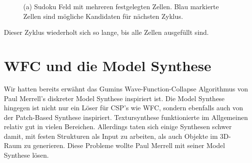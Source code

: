 \documentclass[12pt, a4paper,twoside,openright]{report}
\begin{document}
\begin{figure}[H]
    \centering
    \caption{(a) Sudoku Feld mit mehreren festgelegten Zellen. Blau markierte Zellen sind mögliche Kandidaten für nächsten Zyklus.}%
\end{figure}

Dieser Zyklus wiederholt sich so lange, bis alle Zellen ausgefüllt sind.

\section{WFC und die Model Synthese}

Wir hatten bereits erwähnt das Gumins Wave-Function-Collapse Algorithmus von Paul Merrell's diskreter Model Synthese inspiriert ist.
Die Model Synthese hingegen ist nicht nur ein Löser für CSP's wie WFC, sondern ebenfalls auch von der Patch-Based Synthese inspiriert.
Textursynthese funktionierte im Allgemeinen relativ gut in vielen Bereichen.
Allerdings taten sich einige Synthesen schwer damit, mit festen Strukturen als Input zu arbeiten, als auch Objekte im 3D-Raum zu generieren.
Diese Probleme wollte Paul Merrell mit seiner Model Synthese lösen.
\end{document}
